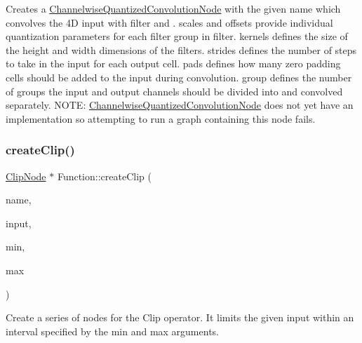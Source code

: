 Creates a \hyperlink{classglow_1_1_channelwise_quantized_convolution_node}{Channelwise\+Quantized\+Convolution\+Node} with the given {\ttfamily name} which convolves the 4D {\ttfamily input} with {\ttfamily filter} and . {\ttfamily scales} and {\ttfamily offsets} provide individual quantization parameters for each filter group in {\ttfamily filter}. {\ttfamily kernels} defines the size of the height and width dimensions of the filters. {\ttfamily strides} defines the number of steps to take in the input for each output cell. {\ttfamily pads} defines how many zero padding cells should be added to the input during convolution. {\ttfamily group} defines the number of groups the input and output channels should be divided into and convolved separately. N\+O\+TE\+: \hyperlink{classglow_1_1_channelwise_quantized_convolution_node}{Channelwise\+Quantized\+Convolution\+Node} does not yet have an implementation so attempting to run a graph containing this node fails. \mbox{\label{classglow_1_1_function_af91f1a1f6278ab97ef760c5a04b34a6a}} 
\subsubsection{\texorpdfstring{create\+Clip()}{createClip()}}
{\footnotesize\ttfamily \hyperlink{classglow_1_1_clip_node}{Clip\+Node} $\ast$ Function\+::create\+Clip (\begin{DoxyParamCaption}\item[{llvm\+::\+String\+Ref}]{name,  }\item[{\hyperlink{structglow_1_1_node_value}{Node\+Value}}]{input,  }\item[{float}]{min,  }\item[{float}]{max }\end{DoxyParamCaption})}

Create a series of nodes for the Clip operator. It limits the given input within an interval specified by the {\ttfamily min} and {\ttfamily max} arguments. \mbox{\label{classglow_1_1_function_a0b28c191e7dbb0c0c83165a7c7107313}} 
